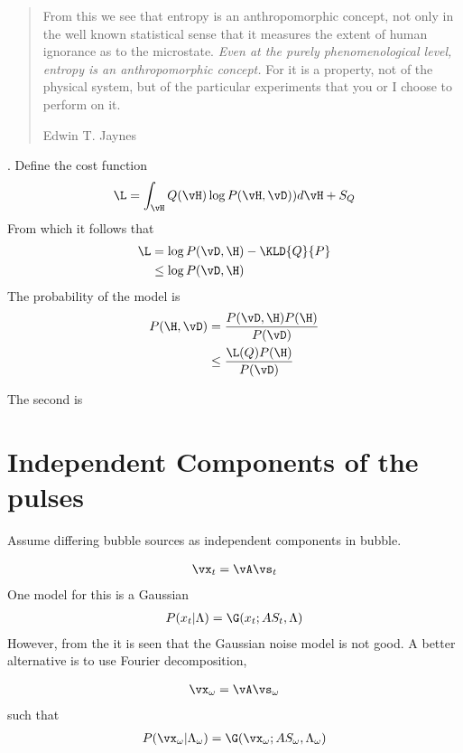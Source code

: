 {{{\begin{quote}
From this we see that entropy is an anthropomorphic concept,
not only in the well known statistical sense that it measures the extent of human ignorance as to the microstate.
{\em Even at the purely phenomenological level, entropy is an anthropomorphic concept.}
For it is a property, not of the physical system,
but of the particular experiments that you or I choose to perform on it.

\flushright Edwin T. Jaynes\cite{Jaynes1965}
\end{quote}
}.
Define the  cost function
\begin{align}
  \L =  \int_\vH Q(\vH) \log P(\vH,\vD) ) d\vH +S_Q  
\end{align}
From which it follows that
\begin{align}
  \L &=   \log P(\vD,\H) - \KLD{Q}{P} \\
     &\le \log P(\vD,\H)
\end{align}
The probability of the model is 
\begin{align}
  P(\H, \vD) &=    \frac{P(\vD, \H) P(\H)}{P(\vD)}\\
             &\le  \frac{\L(Q)P(\H)}{P(\vD)}
\end{align}
\item The second is
}




\section{Independent Components of the pulses}

Assume differing bubble sources as independent components in bubble.

\begin{align}
\vx_t = \vA \vs_t
\end{align}
One model for this is a Gaussian
\begin{align}
  P(x_t| \Lambda) = \G(x_t; AS_t, \Lambda)
\end{align}
However,
from the \figref{} it is seen that the Gaussian noise model is not good.
A better alternative is to use Fourier decomposition,

\begin{align}
  \vx_\omega = \vA \vs_\omega
\end{align}
such that
\begin{align}
  P(\vx_\omega| \Lambda_\omega) = \G( \vx_\omega ; AS_\omega, \Lambda_\omega)
\end{align}

}
